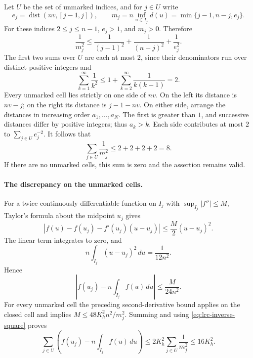 \documentclass[11pt,a4paper]{article}
\begin{document}
Let $U$ be the set of unmarked indices, and for $j\in U$ write
\[
 e_j=\operatorname{dist}(nv,[j-1,j]),\qquad
 m_j=n\inf_{u\in I_j}d(u)
     =\min\{j-1,n-j,e_j\}.
\]
For these indices $2\leq j\leq n-1$, $e_j>1$, and $m_j>0$.
Therefore
\[
 \frac1{m_j^2}
 \leq\frac1{(j-1)^2}+\frac1{(n-j)^2}+\frac1{e_j^2}.
\]
The first two sums over $U$ are each at most $2$, since their
denominators run over distinct positive integers and
\[
 \sum_{k=1}^{\infty}\frac1{k^2}
 \leq1+\sum_{k=2}^{\infty}\frac1{k(k-1)}=2.
\]
Every unmarked cell lies strictly on one side of $nv$. On the left
its distance is $nv-j$; on the right its distance is $j-1-nv$.
On either side, arrange the distances in increasing order
$a_1,\ldots,a_N$. The first is greater than $1$, and successive
distances differ by positive integers; thus $a_k>k$.
Each side contributes at most $2$ to $\sum_{j\in U}e_j^{-2}$.
It follows that
\begin{equation}\label{eq:lrc-inverse-square}
 \sum_{j\in U}\frac1{m_j^2}\leq2+2+2+2=8.
\end{equation}
If there are no unmarked cells, this sum is zero and the assertion
remains valid.

\paragraph{The discrepancy on the unmarked cells.}
For a twice continuously differentiable function on $I_j$ with
$\sup_{I_j}|f''|\leq M$, Taylor's formula about the midpoint $u_j$
gives
\[
 |f(u)-f(u_j)-f'(u_j)(u-u_j)|\leq\frac M2(u-u_j)^2.
\]
The linear term integrates to zero, and
\[
 n\int_{I_j}(u-u_j)^2\,du=\frac1{12n^2}.
\]
Hence
\[
 \left|f(u_j)-n\int_{I_j}f(u)\,du\right|
 \leq\frac{M}{24n^2}.
\]
For every unmarked cell the preceding second-derivative bound
applies on the closed cell and implies
$M\leq48K_h^2n^2/m_j^2$. Summing and using
\eqref{eq:lrc-inverse-square} proves
\begin{equation}\label{eq:lrc-unmarked-total}
 \sum_{j\in U}\left(f(u_j)-n\int_{I_j}f(u)\,du\right)
 \leq2K_h^2\sum_{j\in U}\frac1{m_j^2}
 \leq16K_h^2.
\end{equation}
\end{document}
